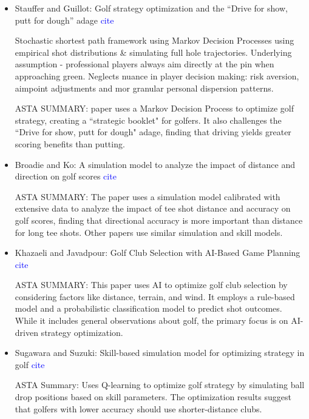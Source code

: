\documentclass[11pt, letterpaper]{article}
\begin{document}
\begin{itemize}
    \item Stauffer and Guillot: Golf strategy optimization and the “Drive for show, putt for dough” adage \textcolor{blue}{cite}
    
     Stochastic shortest path framework using Markov Decision Processes using empirical shot distributions \& simulating full hole trajectories. Underlying assumption - professional players always aim directly at the pin when approaching green. Neglects nuance in player decision making: risk aversion, aimpoint adjustments and mor granular personal dispersion patterns.
     
     ASTA SUMMARY: paper uses a Markov Decision Process to optimize golf strategy, creating a ``strategic booklet" for golfers. It also challenges the ``Drive for show, putt for dough" adage, finding that driving yields greater scoring benefits than putting.
    
    \item Broadie and Ko: A simulation model to analyze the impact of distance and direction on golf scores \textcolor{blue}{cite}

    ASTA SUMMARY: The paper uses a simulation model calibrated with extensive data to analyze the impact of tee shot distance and accuracy on golf scores, finding that directional accuracy is more important than distance for long tee shots. Other papers use similar simulation and skill models.

    \item Khazaeli and Javadpour: Golf Club Selection with AI-Based Game Planning \textcolor{blue}{cite}

    ASTA SUMMARY: This paper uses AI to optimize golf club selection by considering factors like distance, terrain, and wind. It employs a rule-based model and a probabilistic classification model to predict shot outcomes. While it includes general observations about golf, the primary focus is on AI-driven strategy optimization.

    \item Sugawara and Suzuki: Skill-based simulation model for optimizing strategy in golf \textcolor{blue}{cite}

    ASTA Summary: Uses Q-learning to optimize golf strategy by simulating ball drop positions based on skill parameters. The optimization results suggest that golfers with lower accuracy should use shorter-distance clubs.

\end{itemize}
\end{document}
